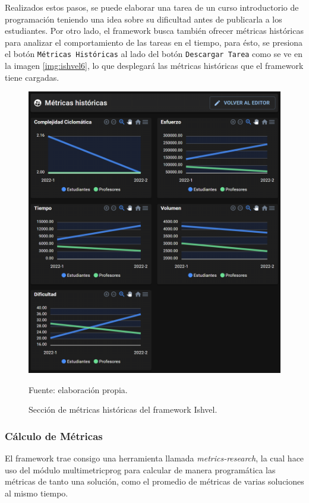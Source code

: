 \documentclass[letterpaper,12pt]{article}
\begin{document}
Realizados estos pasos, se puede elaborar una tarea de un curso introductorio de programación teniendo una idea sobre su dificultad antes de publicarla a los estudiantes. Por otro lado, el framework busca también ofrecer métricas históricas para analizar el comportamiento de las tareas en el tiempo, para ésto, se presiona el botón \texttt{Métricas Históricas} al lado del botón \texttt{Descargar Tarea} como se ve en la imagen \ref{img:ishvel6}, lo que desplegará las métricas históricas que el framework tiene cargadas.

\begin{figure}[H]
  \centering
  \includegraphics[width=1\textwidth]{figures/ishvel7.png}
  \caption{Sección de métricas históricas del framework Ishvel.} Fuente: elaboración propia.
  \label{img:ishvel71}
\end{figure}

\subsubsection{Cálculo de Métricas} \label{sssec:metricsCalc}

El framework trae consigo una herramienta llamada \textit{metrics-research}, la cual hace uso del módulo multimetricprog \cite{privkweihmann_multimetricprog} para calcular de manera programática las métricas de tanto una solución, como el promedio de métricas de varias soluciones al mismo tiempo.
\end{document}
